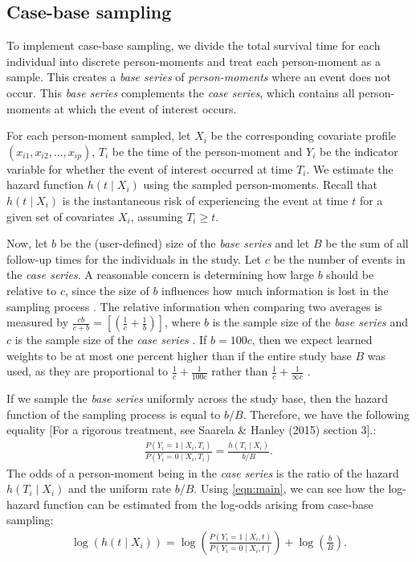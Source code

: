 \documentclass[preprint,12pt,authoryear]{elsarticle}
\begin{document}
\hypertarget{case-base-sampling}{%
\subsection{Case-base sampling}\label{case-base-sampling}}

To implement case-base sampling, we divide the total survival time for each individual into discrete person-moments and treat each person-moment as a sample. This creates a \emph{base series} of \emph{person-moments} where an event does not occur. This \emph{base series} complements the \emph{case series}, which contains all person-moments at which the event of interest occurs.

For each person-moment sampled, let \(X_i\) be the corresponding covariate profile
\(\left(x_{i1},x_{i2},...,x_{ip} \right)\), \(T_i\) be the time of the person-moment and \(Y_i\) be the indicator variable for whether the event of interest occurred at time \(T_i\). We estimate the hazard function
\(h(t \mid X_i)\) using the sampled person-moments. Recall that \(h(t \mid X_i)\) is the instantaneous risk of experiencing the event at time \(t\) for a given set of covariates \(X_i\), assuming \(T_i \geq t\).

Now, let \(b\) be the (user-defined) size of the \emph{base series} and let \(B\) be the sum of all follow-up times for the individuals in the study. Let $c$ be the number of events in the \emph{case series}. A reasonable concern is determining how large $b$ should be relative to $c$, since the size of \(b\) influences how much information is lost in the sampling process \citep{hanley2009}. The relative information when comparing two averages is measured by $\frac{cb}{c+b}=\left[\left( \frac{1}{c}+\frac{1}{b}\right)\right]$, where $b$ is the sample size of the \emph{base series} and $c$ is the sample size of the \emph{case series} \citep{hanley2009} \citep{mantel1}. If $b=100c$, then we expect learned weights to be at most one percent higher than if the entire study base $B$ was used, as they are proportional to $\frac{1}{c}+\frac{1}{100c}$ rather than $\frac{1}{c}+\frac{1}{\infty c}$ \citep{hanley2009} \citep{mantel1}.

If we sample the \emph{base series} uniformly across the study base, then the hazard function of the sampling process is equal to \(b/B\). Therefore, we have the following equality \citep{saarela2015}
[For a rigorous treatment, see Saarela \& Hanley (2015) section 3].:
\begin{align}\label{eqn:main}
\frac{P\left(Y_i=1 \mid X_i, T_i\right)}{P\left(Y_i = 0 \mid X_i, T_i\right)} = \frac{h\left(T_i \mid X_i\right)}{b/B}.
\end{align} The odds of a person-moment being in the \emph{case
series} is the ratio of the hazard \(h(T_i \mid X_i)\) and the uniform
rate \(b/B\). Using \eqref{eqn:main}, we can see how the log-hazard
function can be estimated from the log-odds arising from case-base
sampling: \begin{align}\label{eqn:offset}
\log \left( h\left(t \mid X_i\right)\right) = \log \left(\frac{P\left(Y_i = 1 \mid X_i, t\right)}{P\left(Y_i = 0 \mid X_i, t\right)}\right) + \log\left(\frac{b}{B}\right).
\end{align}
\end{document}
